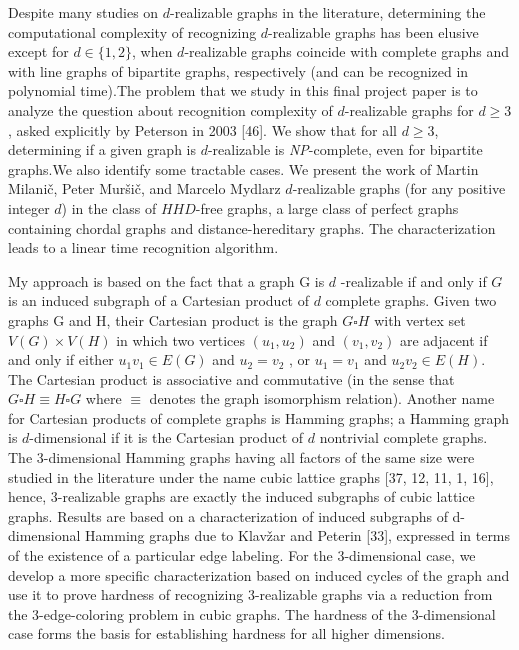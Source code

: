 \documentclass[12pt,a4paper,titlepage,openany]{report}
\begin{document}
Despite many studies on $d$-realizable graphs in the literature, determining the computational complexity of recognizing $d$-realizable graphs has been elusive except for $d \in \{1, 2\}$,
when $d$-realizable graphs coincide with complete graphs and with line graphs of bipartite graphs, respectively (and can be recognized in polynomial time).The problem that we study in this final project paper is to analyze the question about recognition complexity of $d$-realizable graphs for $d \geq 3$, asked explicitly by Peterson in 2003 [46].
We show that for all $d \geq 3$, determining if a given graph is $d$-realizable is {\it NP}-complete, even for bipartite graphs.We also identify some tractable cases.
We present the work of Martin Milani\v c, Peter Mur\v si\v c, and Marcelo Mydlarz $d$-realizable graphs (for any positive integer $d$) in the class of $HHD$-free graphs, a large class of perfect graphs containing chordal graphs and distance-hereditary graphs. The characterization leads to a linear time recognition algorithm.\newline

My approach is based on the fact that a graph G is $d$ -realizable if and only if $G$ is an induced subgraph of a Cartesian product of $d$ complete graphs. Given two graphs G and H, their Cartesian product is the graph $G\square H$ with vertex set $V (G) \times V (H)$ in which two
vertices $(u_1 , u_2 )$ and $(v_1 , v_2 )$ are adjacent if and only if either $u_1 v_1\in E(G)$ and $u_2 = v_2$ ,
or $u_1 = v_1$ and $u_2 v_2 \in E(H)$. The Cartesian product is associative and commutative (in
the sense that $G\square H \equiv H\square G$ where $\equiv$ denotes the graph isomorphism relation). Another
name for Cartesian products of complete graphs is Hamming graphs; a Hamming graph is $d$-dimensional if it is the Cartesian product of $d$ nontrivial complete graphs. The 3-dimensional Hamming graphs having all factors of the same size were studied in the literature under the name cubic lattice graphs [37, 12, 11, 1, 16], hence, 3-realizable graphs are exactly the induced subgraphs of cubic lattice graphs. Results are based on a characterization of induced subgraphs of d-dimensional Hamming graphs due to Klav\v zar and Peterin [33], expressed in terms of the existence of a particular edge labeling. For the 3-dimensional case, we develop a more specific characterization based on induced cycles of the graph and use it to prove hardness of recognizing 3-realizable graphs via a reduction from the 3-edge-coloring problem
in cubic graphs. The hardness of the 3-dimensional case forms the basis for establishing hardness for all higher dimensions.\newline
\end{document}

